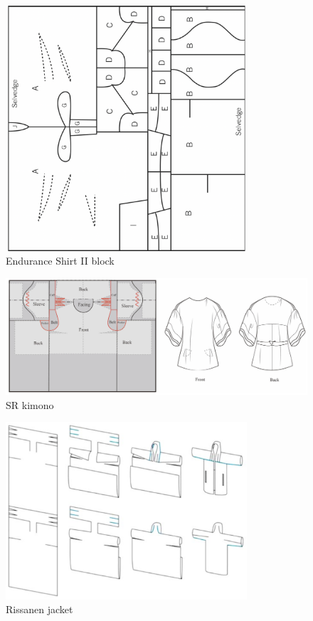 \begin{figure} [H]
    \centering
    \includegraphics[width=0.8\textwidth]{Images/endurance shirt ii.png}
    \caption{Endurance Shirt II block}
\end{figure}
\begin{figure} [H]
    \centering
    \includegraphics[width=\textwidth]{Images/SR kimono.png}
    \caption{SR kimono}
\end{figure}
\begin{figure} [H]
    \centering
    \includegraphics[width=0.8\textwidth]{Images/rissanen jacket.png}
    \caption{Rissanen jacket}
\end{figure}
